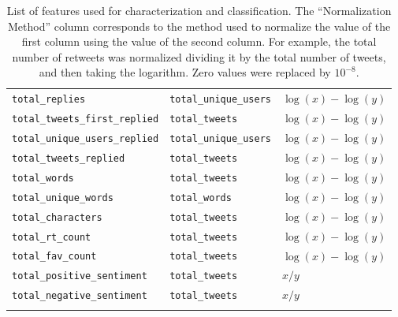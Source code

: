 {\begin{longtable}{l|l|l}
    \texttt{total\_replies} & \texttt{total\_unique\_users} &
    $\log(x) - \log(y)$ \\
    \texttt{total\_tweets\_first\_replied} & \texttt{total\_tweets} &
    $\log(x) - \log(y)$ \\
    \texttt{total\_unique\_users\_replied} &
    \texttt{total\_unique\_users} &
    $\log(x) - \log(y)$ \\
    \texttt{total\_tweets\_replied}	&	 \texttt{total\_tweets}	&	 $\log(x) - \log(y)$ \\
    \texttt{total\_words}	&	 \texttt{total\_tweets}	&	 $\log(x) - \log(y)$ \\
    \texttt{total\_unique\_words}	&	 \texttt{total\_words}	&	 $\log(x) - \log(y)$ \\
    \texttt{total\_characters}	&	 \texttt{total\_tweets}	&	 $\log(x) - \log(y)$ \\
    \texttt{total\_rt\_count}	&	 \texttt{total\_tweets}	&	 $\log(x) - \log(y)$ \\
    \texttt{total\_fav\_count}	&	 \texttt{total\_tweets}	&	 $\log(x) - \log(y)$ \\
    \texttt{total\_positive\_sentiment}	& \texttt{total\_tweets}	&	 $x / y$ \\
    \texttt{total\_negative\_sentiment}	&	 \texttt{total\_tweets}	&	 $x / y$ \\
    \hline

    \caption[Features used for classification of activity]{List of
        features used for characterization and classification. The
        ``Normalization Method'' column corresponds to the method used to
        normalize the value of the first column using the value of the second
        column. For example, the total number of retweets was normalized
        dividing it by the total number of tweets, and then taking the
        logarithm. Zero values were replaced by $10^{-8}$.}
    \label{tab:feats}
  \end{longtable}}

